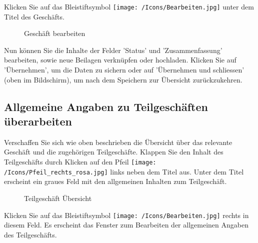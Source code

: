 Klicken Sie auf das Bleistiftsymbol \texttt{[image: /Icons/Bearbeiten.jpg]}  unter dem Titel des Geschäfts.

\begin{figure}[H]
\caption{Geschäft bearbeiten}
\end{figure}

Nun können Sie die Inhalte der Felder 'Status'  und 'Zusammenfassung'  bearbeiten, sowie neue Beilagen  verknüpfen oder hochladen. Klicken Sie auf 'Übernehmen',  um die Daten zu sichern oder auf 'Übernehmen und schliessen' (oben im Bildschirm), um nach dem Speichern zur Übersicht zurückzukehren.

\subsection{Allgemeine Angaben zu Teilgeschäften überarbeiten}

Verschaffen Sie sich wie oben beschrieben die Übersicht über das relevante Geschäft und die zugehörigen Teilgeschäfte. Klappen Sie den Inhalt des Teilgeschäfts durch Klicken auf den Pfeil \texttt{[image: /Icons/Pfeil\_rechts\_rosa.jpg]} links neben dem Titel aus. Unter dem Titel erscheint ein graues Feld  mit den allgemeinen Inhalten zum Teilgeschäft.

\begin{figure}[H]
\caption{Teilgeschäft Übersicht}
\end{figure}

Klicken Sie auf das Bleistiftsymbol \texttt{[image: /Icons/Bearbeiten.jpg]}  rechts in diesem Feld. Es erscheint das Fenster zum Bearbeiten der allgemeinen Angaben des Teilgeschäfts.

